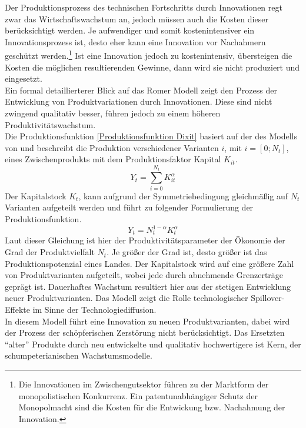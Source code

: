 Der Produktionsprozess des technischen Fortschritts durch Innovationen regt zwar das Wirtschaftswachstum an, jedoch müssen auch die Kosten dieser berücksichtigt werden. Je aufwendiger und somit kostenintensiver ein Innovationsprozess ist, desto eher kann eine Innovation vor Nachahmern geschützt werden.\footnote{Die Innovationen im Zwischengutsektor führen zu der Marktform der monopolistischen Konkurrenz. Ein patentunabhängiger Schutz der Monopolmacht sind die Kosten für die Entwickung bzw. Nachahmung der Innovation.} Ist eine Innovation jedoch zu kostenintensiv, übersteigen die Kosten die möglichen resultierenden Gewinne, dann wird sie nicht produziert und eingesetzt. \\ Ein formal detaillierterer Blick auf das Romer Modell zeigt den Prozess der Entwicklung von Produktvariationen durch Innovationen. Diese sind nicht zwingend qualitativ besser, führen jedoch zu einem höheren Produktivitätswachstum. \\ Die Produktionsfunktion \eqref{Produktionsfunktion Dixit} basiert auf der des Modells von \cite{Dixit.1977} und beschreibt die Produktion verschiedener Varianten $i$, mit $i=[0;N_t]$, eines Zwischenprodukts mit dem Produktionsfaktor Kapital $K_{it}$.
%
	\begin{equation}
		Y_t= \sum_{i=0}^{N_t} K_{it}^\alpha 
	\end{equation}\label{Produktionsfunktion Dixit}
%
Der Kapitalstock $K_t$, kann aufgrund der Symmetriebedingung gleichmäßig auf $N_t$ Varianten aufgeteilt werden und führt zu folgender Formulierung der Produktionsfunktion.
%
	\begin{equation}
		Y_t=N_t^{1-\alpha}K_t^\alpha
	\end{equation}
%
Laut dieser Gleichung ist hier der Produktivitätsparameter der Ökonomie der Grad der Produktvielfalt $N_t$. Je größer der Grad ist, desto größer ist das Produktionspotenzial eines Landes. Der Kapitalstock wird auf eine größere Zahl von Produktvarianten aufgeteilt, wobei jede durch abnehmende Grenzerträge geprägt ist. Dauerhaftes Wachstum resultiert hier aus der stetigen Entwicklung neuer Produktvarianten. Das Modell zeigt die Rolle technologischer Spillover-Effekte im Sinne der Technologiediffusion.\\
%
In diesem Modell führt eine Innovation zu neuen Produktvarianten, dabei wird der Prozess der schöpferischen Zerstörung nicht berücksichtigt. Das Ersetzten "`alter"' Produkte durch neu entwickelte und qualitativ hochwertigere ist Kern, der schumpeterianischen Wachstumsmodelle.
%
